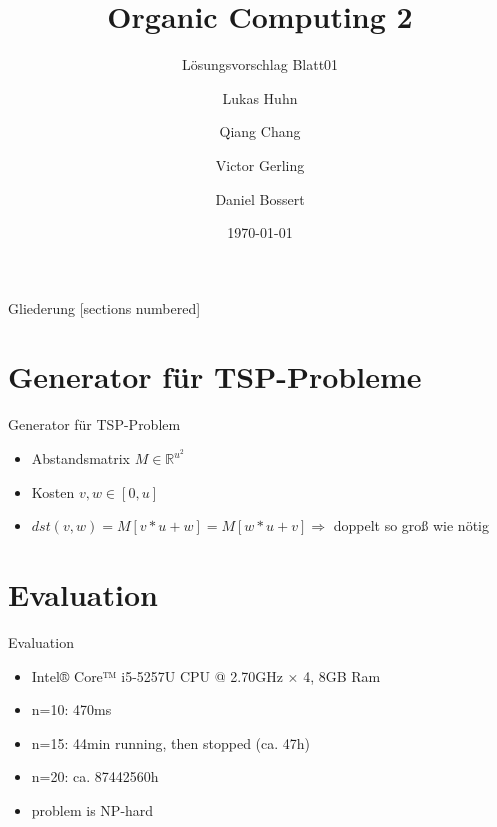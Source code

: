 \documentclass{ocbeameruni}
\title{Organic Computing 2}
\subtitle{Lösungsvorschlag Blatt01}
\date{\today}
\author{Lukas Huhn \and Qiang Chang \and Victor Gerling \and Daniel Bossert}
\institute{%
  Universität Augsburg\\
  Institut für Informatik\\
  Lehrstuhl für Organic Computing
}
\newcommand{\R}{\mathbb{R}}
\begin{document}
\maketitle


\begin{frame}{Gliederung}
  [sections numbered]
  \tableofcontents
\end{frame}


\section{Generator für TSP-Probleme}

\begin{frame}{Generator für TSP-Problem}
    \begin{itemize}
    \item Abstandsmatrix $M \in {\R}^{u^{2}}$
    \item Kosten $v,w \in [0,u]$
    \item $dst(v,w) = M[v*u+w] = M[w*u+v] \Rightarrow$ 
    doppelt so groß wie nötig
    \end{itemize}
\end{frame}


\section{Evaluation}

\begin{frame}{Evaluation}
    \begin{itemize}
        \item Intel® Core™ i5-5257U CPU @ 2.70GHz × 4, 8GB Ram
        \item n=10: 470ms 
        \item n=15: 44min running, then stopped (ca. 47h)
        \item n=20: ca. 87442560h
        \item problem is NP-hard
    \end{itemize}
\end{frame}
\end{document}
